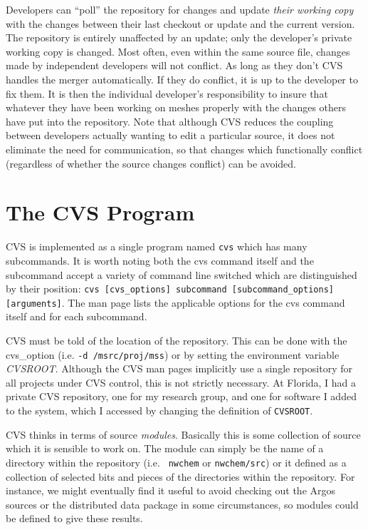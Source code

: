 Developers can ``poll'' the repository for changes and update {\em
  their working copy} with the changes between their last checkout or
update and the current version.  The repository is entirely unaffected
by an update; only the developer's private working copy is changed.
Most often, even within the same source file, changes made by
independent developers will not conflict.  As long as they don't CVS
handles the merger automatically.  If they do conflict, it is up to
the developer to fix them.  It is then the individual developer's
responsibility to insure that whatever they have been working on
meshes properly with the changes others have put into the repository.
Note that although CVS reduces the coupling between developers
actually wanting to edit a particular source, it does not eliminate
the need for communication, so that changes which functionally
conflict (regardless of whether the source changes conflict) can be
avoided.

\section{The CVS Program}

CVS is implemented as a single program named {\tt cvs} which has many
subcommands.  It is worth noting both the cvs command itself and the
subcommand accept a variety of command line switched which are
distinguished by their position: {\tt cvs [cvs\_options] subcommand
[subcommand\_options] [arguments]}.  The man page lists the
applicable options for the cvs command itself and for each subcommand.

CVS must be told of the location of the repository.  This can be done
with the cvs\_option (i.e. {\tt -d /msrc/proj/mss}) or by setting
the environment variable {\it CVSROOT}.  Although the CVS man pages
implicitly use a single repository for all projects under CVS control,
this is not strictly necessary.  At Florida, I had a private CVS
repository, one for my research group, and one for software I added to
the system, which I accessed by changing the definition of {\tt CVSROOT}.

CVS thinks in terms of source {\em modules}.  Basically this is some
collection of source which it is sensible to work on.  The module can
simply be the name of a directory within the repository (i.e. {\tt
nwchem} or {\tt nwchem/src}) or it defined as a collection of selected
bits and pieces of the directories within the repository.  For
instance, we might eventually find it useful to avoid checking out the
Argos sources or the distributed data package in some circumstances,
so modules could be defined to give these results.


